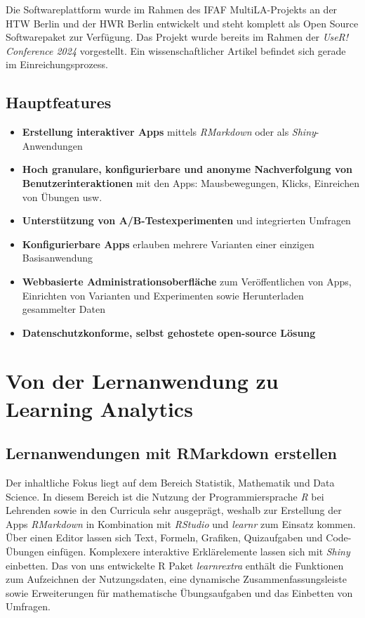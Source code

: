 \documentclass[a0,portrait]{a0poster}
\begin{document}
\begin{multicols}{2}
Die Softwareplattform wurde im Rahmen des IFAF MultiLA-Projekts an der HTW Berlin und der HWR Berlin entwickelt und steht komplett als Open Source Softwarepaket zur Verfügung. Das Projekt wurde bereits im Rahmen der \textit{UseR! Conference 2024} \cite{userconf24} vorgestellt. Ein wissenschaftlicher Artikel befindet sich gerade im Einreichungsprozess.

\subsection*{Hauptfeatures}

\begin{itemize}
    \item \textbf{Erstellung interaktiver Apps} mittels \textit{RMarkdown} oder als \textit{Shiny}-Anwendungen
    \item \textbf{Hoch granulare, konfigurierbare und anonyme Nachverfolgung von Benutzerinteraktionen} mit den Apps: Mausbewegungen, Klicks, Einreichen von Übungen usw.
    \item \textbf{Unterstützung von A/B-Testexperimenten} und integrierten Umfragen
    \item \textbf{Konfigurierbare Apps} erlauben mehrere Varianten einer einzigen Basisanwendung
    \item \textbf{Webbasierte Administrationsoberfläche} zum Veröffentlichen von Apps, Einrichten von Varianten und Experimenten sowie Herunterladen gesammelter Daten
    \item \textbf{Datenschutzkonforme, selbst gehostete open-source Lösung}
\end{itemize}

\section*{Von der Lernanwendung zu Learning Analytics}

\subsection*{Lernanwendungen mit RMarkdown erstellen}

Der inhaltliche Fokus liegt auf dem Bereich Statistik, Mathematik und Data Science. In diesem Bereich ist die Nutzung der Programmiersprache \textit{R} bei Lehrenden sowie in den Curricula sehr ausgeprägt, weshalb zur Erstellung der Apps \textit{RMarkdown} in Kombination mit \textit{RStudio} und \textit{learnr} \cite{aden-buie_learnr_2023} zum Einsatz kommen. Über einen Editor lassen sich Text, Formeln, Grafiken, Quizaufgaben und Code-Übungen einfügen. Komplexere interaktive Erklärelemente lassen sich mit \textit{Shiny} einbetten. Das von uns entwickelte R Paket \textit{learnrextra} \cite{konrad_ifafmultilalearnrextra_2024} enthält die Funktionen zum Aufzeichnen der Nutzungsdaten, eine dynamische Zusammenfassungsleiste sowie Erweiterungen für mathematische Übungsaufgaben und das Einbetten von Umfragen.


\end{multicols}
\end{document}
